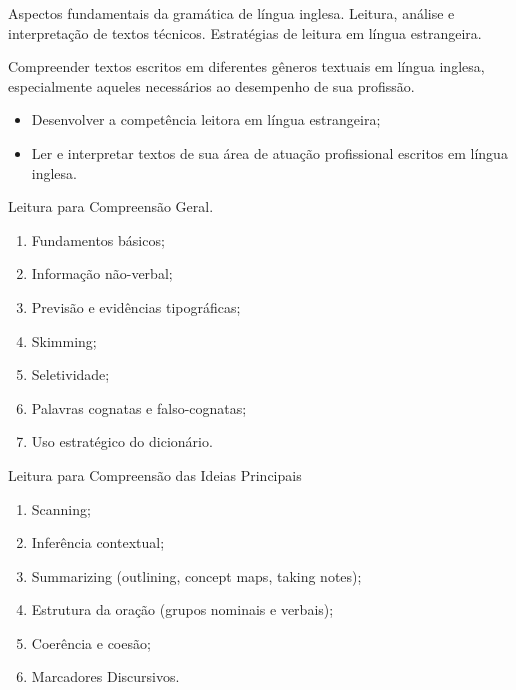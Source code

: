 \begin{pud}

	
	\ementa 
	Aspectos fundamentais da gramática de língua inglesa. Leitura, análise e interpretação de textos técnicos. Estratégias de leitura em língua estrangeira.

	\objetivos
	Compreender textos escritos em diferentes gêneros textuais em língua inglesa, especialmente aqueles necessários ao desempenho de sua profissão.

	\begin{itemize}
	  \item Desenvolver a competência leitora em língua estrangeira;
	  \item Ler e interpretar textos de sua área de atuação profissional escritos em língua inglesa.
	\end{itemize}
	
	\programa
	\begin{description}[itemsep=0em]
		\item[UNIDADE I:] Leitura para Compreensão Geral.
	    \begin{enumerate}[itemsep=0em, topsep=0em]
	     \item Fundamentos básicos;
	     \item Informação não-verbal;
	     \item Previsão e evidências tipográficas;
	     \item Skimming;
	     \item Seletividade;
	     \item Palavras cognatas e falso-cognatas;
	     \item Uso estratégico do dicionário.
	   \end{enumerate}
	   
	   \item[UNIDADE II:] Leitura para Compreensão das Ideias Principais
	    \begin{enumerate}[itemsep=0em, topsep=0em]
	     \item Scanning;
	     \item Inferência contextual;
	     \item Summarizing (outlining, concept maps, taking notes);
	     \item Estrutura da oração (grupos nominais e verbais);
	     \item Coerência e coesão;
	     \item Marcadores Discursivos.
	   \end{enumerate}
	   

\end{description}
\end{pud}
